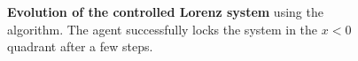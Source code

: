 \begin{figure}[h!]
\centering
\caption{\textbf{Evolution of the controlled Lorenz system} using the \ppo algorithm. The agent successfully locks the system in the $x<0$ quadrant after a few steps.}
\label{fig:lorenz}
\end{figure} 
